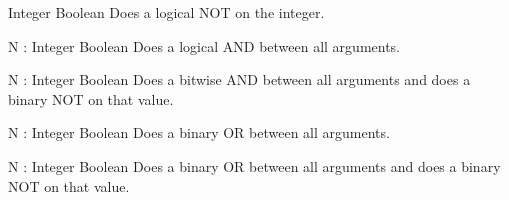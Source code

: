     \begin{commands}

                {Integer}
                {Boolean}
                {
                    Does a logical NOT on the integer.
                }

                {N : Integer}
                {Boolean}
                {
                    Does a logical AND between all arguments.
                }

                {N : Integer}
                {Boolean}
                {
                    Does a bitwise AND between all arguments and does a binary
                    NOT on that value.
                }

                {N : Integer}
                {Boolean}
                {
                    Does a binary OR between all arguments.
                }

                {N : Integer}
                {Boolean}
                {
                    Does a binary OR between all arguments and does a binary
                    NOT on that value.
                }

    \end{commands}


